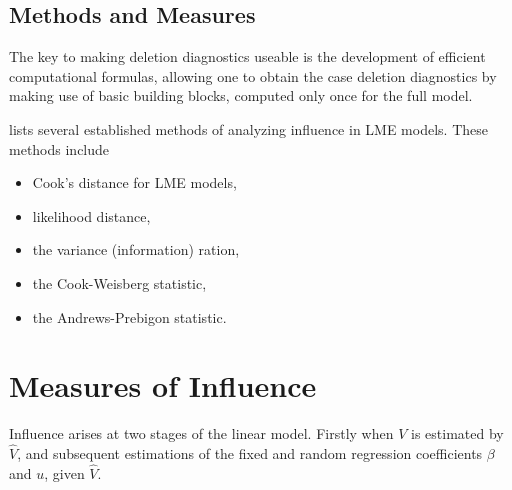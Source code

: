 \documentclass[12pt, a4paper]{report}
\begin{document}
\subsection{Methods and Measures}
The key to making deletion diagnostics useable is the development of efficient computational formulas, allowing one to obtain the  case deletion diagnostics by making use of basic building blocks, computed only once for the full model.


\citet{Zewotir} lists several established methods of analyzing influence in LME models. These methods include \begin{itemize}
	\item Cook's distance for LME models,
	\item {} likelihood distance,
	\item the variance (information) ration,
	\item the  Cook-Weisberg statistic,
	\item the  Andrews-Prebigon statistic.
\end{itemize}

\section{Measures of Influence} %



Influence arises at two stages of the linear model. Firstly when $V$ is estimated by $\hat{V}$, and subsequent
estimations of the fixed and random regression coefficients $\beta$ and $u$, given $\hat{V}$.
\end{document}
